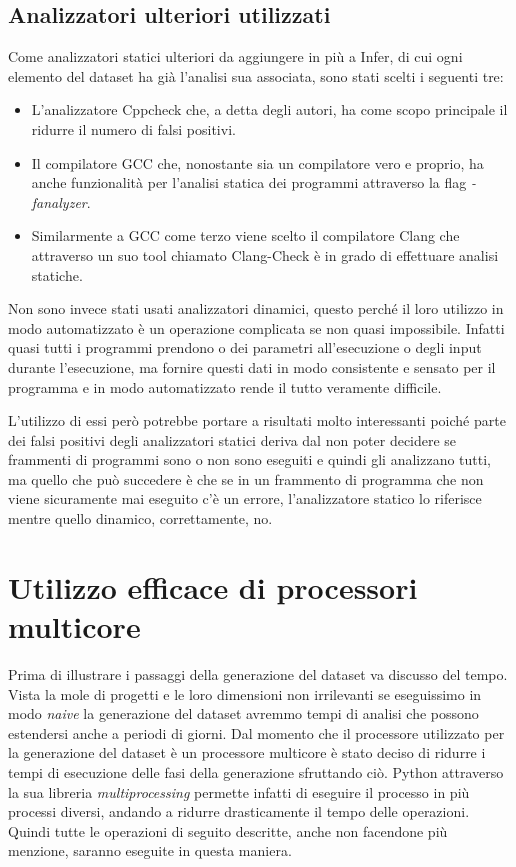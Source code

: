 \subsection{Analizzatori ulteriori utilizzati}
Come analizzatori statici ulteriori da aggiungere in più a Infer, di cui ogni elemento del dataset ha già l'analisi sua associata, sono stati scelti i seguenti tre:
    \begin{itemize}
        \item L'analizzatore Cppcheck che, a detta degli autori, ha come scopo principale il ridurre il numero di falsi positivi.
        \item Il compilatore GCC che, nonostante sia un compilatore vero e proprio, ha anche funzionalità per l'analisi statica dei programmi attraverso la flag \textit{-fanalyzer}.
        \item Similarmente a GCC come terzo viene scelto il compilatore Clang che attraverso un suo tool chiamato Clang-Check è in grado di effettuare analisi statiche.
    \end{itemize}
Non sono invece stati usati analizzatori dinamici, questo perché il loro utilizzo in modo automatizzato è un operazione complicata se non quasi impossibile. 
Infatti quasi tutti i programmi prendono o dei parametri all'esecuzione o degli input durante l'esecuzione, ma fornire questi dati in modo consistente e sensato per il programma e in modo automatizzato rende il tutto veramente difficile.

L'utilizzo di essi però potrebbe portare a risultati molto interessanti poiché parte dei falsi positivi degli analizzatori statici deriva dal non poter decidere se frammenti di programmi sono o non sono eseguiti e quindi gli analizzano tutti, ma quello che può succedere
è che se in un frammento di programma che non viene sicuramente mai eseguito c'è un errore, l'analizzatore statico lo riferisce mentre quello dinamico, correttamente, no.


\section{Utilizzo efficace di processori multicore}
Prima di illustrare i passaggi della generazione del dataset va discusso del tempo.
Vista la mole di progetti e le loro dimensioni non irrilevanti se eseguissimo in modo \textit{naive} la generazione del dataset avremmo tempi di analisi che possono estendersi anche a periodi di giorni.
Dal momento che il processore utilizzato per la generazione del dataset è un processore multicore è stato deciso di ridurre i tempi di esecuzione delle fasi della generazione sfruttando ciò.
Python attraverso la sua libreria \textit{multiprocessing} permette infatti di eseguire il processo in più processi diversi, andando a ridurre drasticamente il tempo delle operazioni.
Quindi tutte le operazioni di seguito descritte, anche non facendone più menzione, saranno eseguite in questa maniera.

